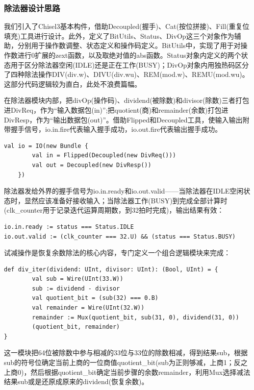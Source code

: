 \documentclass[11pt]{article}
\begin{document}
\subsubsection{除法器设计思路}

我们引入了Chisel3基本构件，借助Decoupled(握手)、Cat(按位拼接)、Fill(重复位填充)工具进行设计。此外，定义了BitUtils、Status、DivOp这三个对象作为辅助，分别用于操作数调整、状态定义和操作码定义。BitUtils中，实现了用于对操作数进行0扩展的zext函数，以及取绝对值的abs函数。Status对象内定义的两个状态用于区分除法器空闲(IDLE)还是正在工作(BUSY)；DivOp对象内用独热码区分了四种除法操作DIV(div.w)、DIVU(div.wu)、REM(mod.w)、REMU(mod.wu)。这部分代码逻辑较为直白，此处不浪费篇幅。



在除法器模块内部，把divOp(操作码)、dividend(被除数)和divisor(除数)三者打包进DivReq，作为“输入数据包(in)”;把quotient(商)和remainder(余数)打包进DivResp，作为“输出数据包(out)”。借助Flipped和Decoupled工具，使输入输出附带握手信号，io.in.fire代表输入握手成功，io.out.fire代表输出握手成功。
\begin{lstlisting}[caption={IO接口}]
val io = IO(new Bundle {
        val in = Flipped(Decoupled(new DivReq()))
        val out = Decoupled(new DivResp())
    })
\end{lstlisting}

除法器发给外界的握手信号为io.in.ready和io.out.valid——当除法器在IDLE空闲状态时，显然应该准备好接收输入；当除法器工作(BUSY)到完成全部计算时(clk_counter用于记录迭代运算周期数，到32拍时完成)，输出结果有效：

\begin{lstlisting}[caption={除法器发向外部的握手信号}]
io.in.ready := status === Status.IDLE
io.out.valid := (clk_counter === 32.U) && (status === Status.BUSY) 
\end{lstlisting}


试减操作是恢复余数除法的核心内容，专门定义一个组合逻辑模块来完成：
\begin{lstlisting}[caption={试减模块(div_iter)}]
def div_iter(dividend: UInt, divisor: UInt): (Bool, UInt) = {
        val sub = Wire(UInt(33.W))
        sub := dividend - divisor
        val quotient_bit = (sub(32) === 0.B)
        val remainder = Wire(UInt(32.W))
        remainder := Mux(quotient_bit, sub(31, 0), dividend(31, 0))
        (quotient_bit, remainder)
}
\end{lstlisting}
这一模块把64位被除数中参与相减的33位与33位的除数相减，得到结果sub，根据sub的符号位确定当前上商的一位商值quotient_bit(sub为正则够减，上商1；反之上商0)，然后根据quotient_bit确定当前步骤的余数remainder，利用Mux选择减法结果sub或是还原成原来的dividend(恢复余数)。
\end{document}
